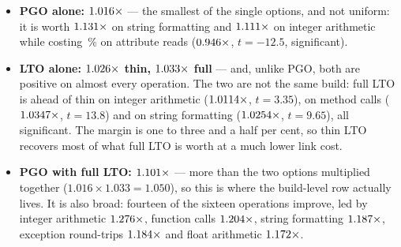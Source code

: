 \begin{itemize}[leftmargin=1.4em,itemsep=1pt]
  \item \textbf{PGO alone: $\meas{geomean:b5_buildcfg-plain|b5_buildcfg-pgo}{1.016}\times$} --- the smallest of the single options, and not
        uniform: it is worth $\meas{ratio:b5_buildcfg-plain:str_format_join/plain|b5_buildcfg-pgo:str_format_join/pgo}{1.131}\times$ on string formatting and $\meas{ratio:b5_buildcfg-plain:int_arith/plain|b5_buildcfg-pgo:int_arith/pgo}{1.111}\times$ on integer
        arithmetic while costing \,\% on attribute reads ($\meas{ratio:b5_buildcfg-plain:attr_get/plain|b5_buildcfg-pgo:attr_get/pgo}{0.946}\times$, $t=-12.5$,
        significant).
  \item \textbf{LTO alone: $\meas{geomean:b5_buildcfg-plain|b5_buildcfg-ltothin}{1.026}\times$ thin, $\meas{geomean:b5_buildcfg-plain|b5_buildcfg-ltofull}{1.033}\times$ full} --- and, unlike PGO, both are
        positive on almost every operation. The two are not the same build: full LTO is ahead of
        thin on integer arithmetic ($\meas{ratio:b5_buildcfg-ltothin:int_arith/ltothin|b5_buildcfg-ltofull:int_arith/ltofull}{1.0114}\times$, $t=3.35$), on method calls
        ($\meas{ratio:b5_buildcfg-ltothin:method_call/ltothin|b5_buildcfg-ltofull:method_call/ltofull}{1.0347}\times$, $t=13.8$) and on string formatting ($\meas{ratio:b5_buildcfg-ltothin:str_format_join/ltothin|b5_buildcfg-ltofull:str_format_join/ltofull}{1.0254}\times$, $t=9.65$), all
        significant. The margin is one to three and a half per cent, so thin LTO recovers most of what full
        LTO is worth at a much lower link cost.
  \item \textbf{PGO with full LTO: $\meas{geomean:b5_buildcfg-plain|b5_buildcfg-pgo_ltofull}{1.101}\times$} --- more than the two options multiplied
        together ($1.016 \times 1.033 = 1.050$), so this is where the build-level row actually
        lives. It is also broad: fourteen of the sixteen operations improve, led by integer
        arithmetic $\meas{ratio:b5_buildcfg-plain:int_arith/plain|b5_buildcfg-pgo_ltofull:int_arith/pgo_ltofull}{1.276}\times$, function calls $\meas{ratio:b5_buildcfg-plain:func_call/plain|b5_buildcfg-pgo_ltofull:func_call/pgo_ltofull}{1.204}\times$, string formatting
        $\meas{ratio:b5_buildcfg-plain:str_format_join/plain|b5_buildcfg-pgo_ltofull:str_format_join/pgo_ltofull}{1.187}\times$, exception round-trips $\meas{ratio:b5_buildcfg-plain:exception_roundtrip/plain|b5_buildcfg-pgo_ltofull:exception_roundtrip/pgo_ltofull}{1.184}\times$ and float arithmetic $\meas{ratio:b5_buildcfg-plain:float_arith/plain|b5_buildcfg-pgo_ltofull:float_arith/pgo_ltofull}{1.172}\times$.

\end{itemize}
